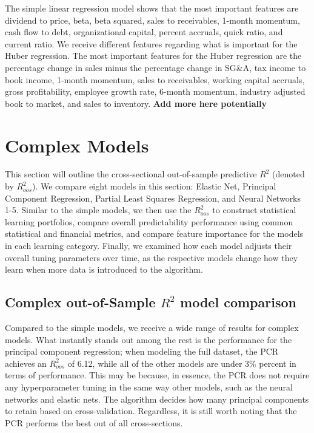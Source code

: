 The simple linear regression model shows that the most important features are dividend to price, beta, beta squared, sales to receivables, 1-month momentum, cash flow to debt, organizational capital, percent accruals, quick ratio, and current ratio. We receive different features regarding what is important for the Huber regression. The most important features for the Huber regression are the percentage change in sales minus the percentage change in SG\&A, tax income to book income, 1-month momentum, sales to receivables, working capital accruals, gross profitability, employee growth rate, 6-month momentum, industry adjusted book to market, and sales to inventory.
\textbf{Add more here potentially}

\section{Complex Models}

This section will outline the cross-sectional out-of-sample predictive $R^2$ (denoted by $R^2_{oos}$). We compare eight models in this section: Elastic Net, Principal Component Regression, Partial Least Squares Regression, and Neural Networks 1-5. Similar to the simple models, we then use the $R^2_{oos}$ to construct statistical learning portfolios, compare overall predictability performance using common statistical and financial metrics, and compare feature importance for the models in each learning category. Finally, we examined how each model adjusts their overall tuning parameters over time, as the respective models change how they learn when more data is introduced to the algorithm.

\subsection{Complex out-of-Sample $R^2$ model comparison}

Compared to the simple models, we receive a wide range of results for complex models. What instantly stands out among the rest is the performance for the principal component regression; when modeling the full dataset, the PCR achieves an $R^2_{oos}$ of 6.12, while all of the other models are under 3\% percent in terms of performance. This may be because, in essence, the PCR does not require any hyperparameter tuning in the same way other models, such as the neural networks and elastic nets. The algorithm decides how many principal components to retain based on cross-validation. Regardless, it is still worth noting that the PCR performs the best out of all cross-sections.

